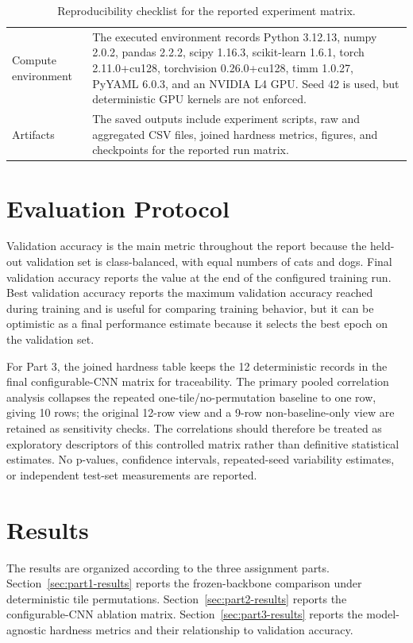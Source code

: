\documentclass[12pt]{article}
\begin{document}
\begin{table}[t]
{\begin{tabular}{p{}p{}}
    Compute environment & The executed environment records Python 3.12.13, numpy 2.0.2, pandas 2.2.2, scipy 1.16.3, scikit-learn 1.6.1, torch 2.11.0+cu128, torchvision 0.26.0+cu128, timm 1.0.27, PyYAML 6.0.3, and an NVIDIA L4 GPU. Seed 42 is used, but deterministic GPU kernels are not enforced. \\
    Artifacts & The saved outputs include experiment scripts, raw and aggregated CSV files, joined hardness metrics, figures, and checkpoints for the reported run matrix. \\
    \bottomrule
  \end{tabular}
  }
  \caption{Reproducibility checklist for the reported experiment matrix.}
  \label{tab:reproducibility-checklist}
\end{table}

\section{Evaluation Protocol}

Validation accuracy is the main metric throughout the report because the held-out validation set is class-balanced, with equal numbers of cats and dogs. Final validation accuracy reports the value at the end of the configured training run. Best validation accuracy reports the maximum validation accuracy reached during training and is useful for comparing training behavior, but it can be optimistic as a final performance estimate because it selects the best epoch on the validation set.

For Part 3, the joined hardness table keeps the 12 deterministic records in the final configurable-CNN matrix for traceability. The primary pooled correlation analysis collapses the repeated one-tile/no-permutation baseline to one row, giving 10 rows; the original 12-row view and a 9-row non-baseline-only view are retained as sensitivity checks. The correlations should therefore be treated as exploratory descriptors of this controlled matrix rather than definitive statistical estimates. No p-values, confidence intervals, repeated-seed variability estimates, or independent test-set measurements are reported.

\section{Results}

The results are organized according to the three assignment parts. Section~\ref{sec:part1-results} reports the frozen-backbone comparison under deterministic tile permutations. Section~\ref{sec:part2-results} reports the configurable-CNN ablation matrix. Section~\ref{sec:part3-results} reports the model-agnostic hardness metrics and their relationship to validation accuracy.
\end{document}
